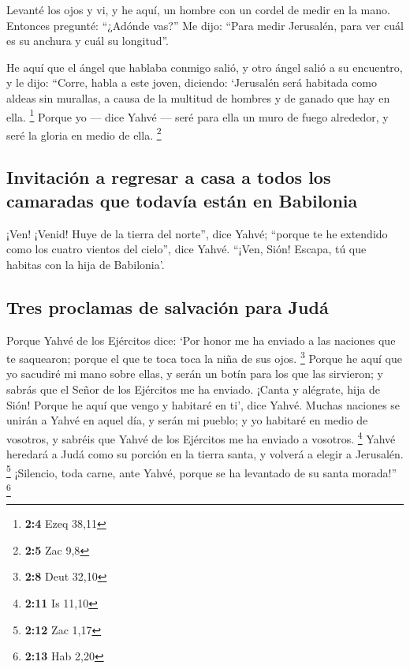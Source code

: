 \begin{paracol}{2}
 Levanté los ojos y vi, y he aquí, un hombre con un cordel
de medir en la mano.  Entonces pregunté: ``¿Adónde vas?''
Me dijo: ``Para medir Jerusalén, para ver cuál es su anchura y cuál su
longitud''.

 He aquí que el ángel que hablaba conmigo salió, y otro
ángel salió a su encuentro,  y le dijo: ``Corre, habla a
este joven, diciendo: `Jerusalén será habitada como aldeas sin murallas,
a causa de la multitud de hombres y de ganado que hay en ella.
\footnote{\textbf{2:4} Ezeq 38,11}  Porque yo --- dice
Yahvé --- seré para ella un muro de fuego alrededor, y seré la gloria en
medio de ella. \footnote{\textbf{2:5} Zac 9,8}

\hypertarget{invitaciuxf3n-a-regresar-a-casa-a-todos-los-camaradas-que-todavuxeda-estuxe1n-en-babilonia}{%
\subsection{Invitación a regresar a casa a todos los camaradas que
todavía están en
Babilonia}\label{invitaciuxf3n-a-regresar-a-casa-a-todos-los-camaradas-que-todavuxeda-estuxe1n-en-babilonia}}

 ¡Ven! ¡Venid! Huye de la tierra del norte'', dice Yahvé;
``porque te he extendido como los cuatro vientos del cielo'', dice
Yahvé.  ``¡Ven, Sión! Escapa, tú que habitas con la hija
de Babilonia'.

\hypertarget{tres-proclamas-de-salvaciuxf3n-para-juduxe1}{%
\subsection{Tres proclamas de salvación para
Judá}\label{tres-proclamas-de-salvaciuxf3n-para-juduxe1}}

 Porque Yahvé de los Ejércitos dice: `Por honor me ha
enviado a las naciones que te saquearon; porque el que te toca toca la
niña de sus ojos. \footnote{\textbf{2:8} Deut 32,10} 
Porque he aquí que yo sacudiré mi mano sobre ellas, y serán un botín
para los que las sirvieron; y sabrás que el Señor de los Ejércitos me ha
enviado.  ¡Canta y alégrate, hija de Sión! Porque he aquí
que vengo y habitaré en ti', dice Yahvé.  Muchas naciones
se unirán a Yahvé en aquel día, y serán mi pueblo; y yo habitaré en
medio de vosotros, y sabréis que Yahvé de los Ejércitos me ha enviado a
vosotros. \footnote{\textbf{2:11} Is 11,10}  Yahvé
heredará a Judá como su porción en la tierra santa, y volverá a elegir a
Jerusalén. \footnote{\textbf{2:12} Zac 1,17}  ¡Silencio,
toda carne, ante Yahvé, porque se ha levantado de su santa morada!''
\footnote{\textbf{2:13} Hab 2,20}


\end{paracol}
